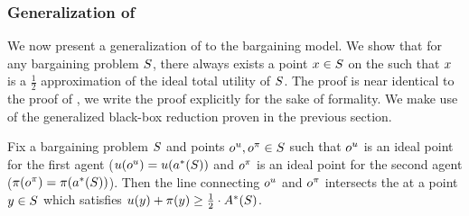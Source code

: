 


\subsubsection{Generalization of \texorpdfstring{}{Theorem~\ref{thm:optimal GFT:general instance}}}

{We now present a generalization of}  to the bargaining model. We show that for any bargaining problem $S$, there always exists a point $x\in S$ on the {\ksline} such that $x$ is a $\frac{1}{2}$ approximation of the ideal {total} utility of $S$. The proof is near identical to the proof of , we write the proof explicitly for the sake of formality. We make use of the generalized black-box reduction   proven in the previous section.

\begin{theorem}
\label{lemma:bargaining:half-approx-ksline}
    Fix a bargaining problem $S$ and points $o^u,o^\pi\in S$ such that $o^u$ is an ideal point for the first agent ($u(o^u)=u(a^*(S))$ and $o^\pi$ is an ideal point for the second agent ($\pi(o^\pi)=\pi(a^*(S))$). Then the line connecting $o^u$ and $o^\pi$ intersects the {\ksline} at a point $y\in S$ which satisfies $u(y)+\pi(y)\geq \frac{1}{2} \cdot A^*(S)$.
\end{theorem}

